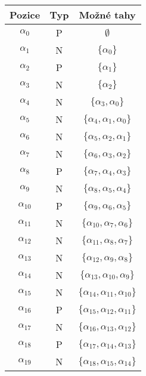\documentclass[../main.tex]{subfiles}
\begin{document}
\begin{center}
    \begin{tabular}{|c|c|c|}
        \hline
        Pozice & Typ & Možné tahy \\
        \hline
        $\alpha_0$ & P & $\emptyset$ \\
        \hline
        $\alpha_1$ & N & $\{ \alpha_0 \}$ \\
        \hline
        $\alpha_2$ & P & $\{ \alpha_1 \}$ \\
        \hline
        $\alpha_3$ & N & $\{ \alpha_2 \}$ \\
        \hline
        $\alpha_4$ & N & $\{ \alpha_3, \alpha_0 \}$ \\
        \hline
        $\alpha_5$ & N & $\{ \alpha_4,  \alpha_1, \alpha_0 \}$ \\
        \hline
        $\alpha_6$ & N & $\{ \alpha_5,  \alpha_2, \alpha_1 \}$ \\
        \hline
        $\alpha_7$ & N & $\{ \alpha_6,  \alpha_3, \alpha_2 \}$ \\
        \hline
        $\alpha_8$ & P & $\{ \alpha_7,  \alpha_4, \alpha_3 \}$ \\
        \hline
        $\alpha_9$ & N & $\{ \alpha_8,  \alpha_5, \alpha_4 \}$ \\
        \hline
        $\alpha_{10}$ & P & $\{ \alpha_9,  \alpha_6, \alpha_5 \}$ \\
        \hline
        $\alpha_{11}$ & N & $\{ \alpha_{10},  \alpha_7, \alpha_6 \}$ \\
        \hline
        $\alpha_{12}$ & N & $\{ \alpha_{11},  \alpha_8, \alpha_7 \}$ \\
        \hline
        $\alpha_{13}$ & N & $\{ \alpha_{12},  \alpha_9, \alpha_8 \}$ \\
        \hline
        $\alpha_{14}$ & N & $\{ \alpha_{13},  \alpha_{10}, \alpha_9 \}$ \\
        \hline
        $\alpha_{15}$ & N & $\{ \alpha_{14},  \alpha_{11}, \alpha_{10} \}$ \\
        \hline
        $\alpha_{16}$ & P & $\{ \alpha_{15},  \alpha_{12}, \alpha_{11} \}$ \\
        \hline
        $\alpha_{17}$ & N & $\{ \alpha_{16},  \alpha_{13}, \alpha_{12} \}$ \\
        \hline
        $\alpha_{18}$ & P & $\{ \alpha_{17},  \alpha_{14}, \alpha_{13} \}$ \\
        \hline
        $\alpha_{19}$ & N & $\{ \alpha_{18},  \alpha_{15}, \alpha_{14} \}$ \\
        \hline
    \end{tabular}

\end{center}
\end{document}
